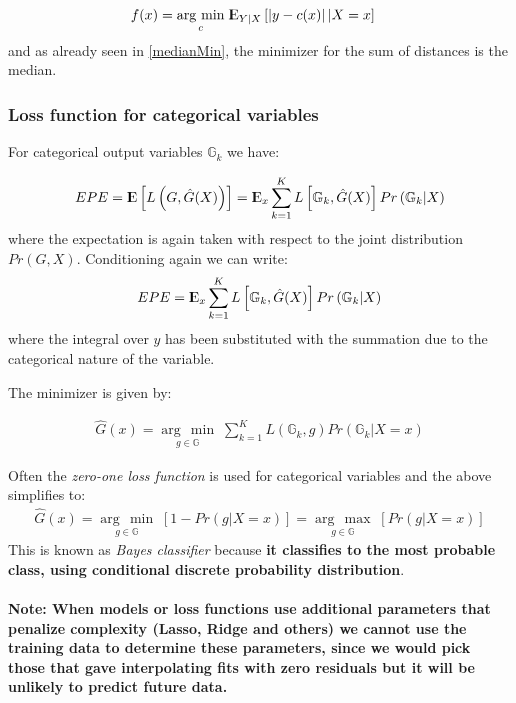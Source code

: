\documentclass[12pt, letterpaper]{article}
\theoremstyle{definition}
\newcommand{\E}{{\rm I\kern-.3em E}}
\newcommand{\argmax}[1]{\underset{#1}{\operatorname{arg}\,\operatorname{max}}\;}
\newcommand{\argmin}[1]{\underset{#1}{\operatorname{arg}\,\operatorname{min}}\;}
\begin{document}
\begin{align}
f(x) &= \argmin{c} \E_{Y|X} \left[ \left| y - c(x) \right| | X=x \right]
\end{align}
and as already seen in \ref{medianMin}, the minimizer for the sum of distances is the median.
\subsubsection{Loss function for categorical variables}
For categorical output variables $\mathbb{G}_k$ we have: 

\begin{align}
EPE = \E\left[ L\left( G, \hat{G}(X)\right)\right] = \E_x \sum_{k=1}^K L\left[ \mathbb{G}_k, \hat{G}(X)\right]Pr\left( \mathbb{G}_k|X\right)
\end{align}
where the expectation is again taken with respect to the joint distribution $Pr(G,X)$. Conditioning again we can write:
\begin{align}
EPE = \E_x \sum_{k=1}^K L\left[ \mathbb{G}_k, \hat{G}(X)\right]Pr\left( \mathbb{G}_k|X\right)
\end{align}
	where the integral over $y$ has been substituted with the summation due to the categorical nature of the variable.

The minimizer is given by:

\begin{align}
\hat{G}(x) = \argmin{g \in \mathbb{G}} \sum_{k=1}^{K} L\left( \mathbb{G}_k, g\right)Pr\left( \mathbb{G}_k | X=x \right)
\end{align}

Often the \textit{zero-one loss function} is used for categorical variables and the above simplifies to:
\begin{align}
\hat{G}(x) = \argmin{g \in \mathbb{G}}  \left[1 - Pr\left( g | X=x \right) \right] =\argmax{g \in \mathbb{G}}  \left[Pr\left( g | X=x \right) \right]
\end{align}
This is known as \textit{Bayes classifier} because \textbf{it classifies to the most probable class, using conditional discrete probability distribution}.

\paragraph{\textbf{Note}: When models or loss functions use additional parameters that penalize complexity (Lasso, Ridge and others) we cannot use the training data to determine these parameters, since we would pick those that gave interpolating fits with zero residuals but it will be unlikely to predict future data.}
\end{document}
